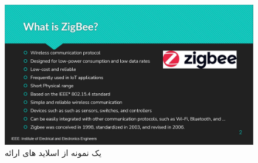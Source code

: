 \begin{figure}[H]
    \centering
    \includegraphics[width=1\linewidth]{images/sample.jpg}
    \caption{یک نمونه از اسلاید های ارائه }
    \label{fig:h}
\end{figure}


